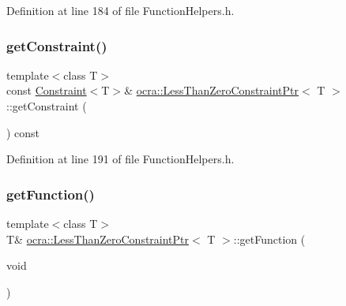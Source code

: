 Definition at line 184 of file Function\+Helpers.\+h.

\hypertarget{classocra_1_1LessThanZeroConstraintPtr_a102482553bd9c85728de1e860903cc16}{}\label{classocra_1_1LessThanZeroConstraintPtr_a102482553bd9c85728de1e860903cc16} 
\subsubsection{\texorpdfstring{get\+Constraint()}{getConstraint()}\hspace{0.1cm}{\footnotesize\ttfamily [2/2]}}
{\footnotesize\ttfamily template$<$class T$>$ \\
const \hyperlink{classocra_1_1Constraint}{Constraint}$<$T$>$\& \hyperlink{classocra_1_1LessThanZeroConstraintPtr}{ocra\+::\+Less\+Than\+Zero\+Constraint\+Ptr}$<$ T $>$\+::get\+Constraint (\begin{DoxyParamCaption}{ }\end{DoxyParamCaption}) const\hspace{0.3cm}{\ttfamily [inline]}}



Definition at line 191 of file Function\+Helpers.\+h.

\hypertarget{classocra_1_1LessThanZeroConstraintPtr_aa2b223f5891963f1b8be99e4408de9f2}{}\label{classocra_1_1LessThanZeroConstraintPtr_aa2b223f5891963f1b8be99e4408de9f2} 
\subsubsection{\texorpdfstring{get\+Function()}{getFunction()}\hspace{0.1cm}{\footnotesize\ttfamily [1/2]}}
{\footnotesize\ttfamily template$<$class T$>$ \\
T\& \hyperlink{classocra_1_1LessThanZeroConstraintPtr}{ocra\+::\+Less\+Than\+Zero\+Constraint\+Ptr}$<$ T $>$\+::get\+Function (\begin{DoxyParamCaption}\item[{void}]{ }\end{DoxyParamCaption})\hspace{0.3cm}{\ttfamily [inline]}}




